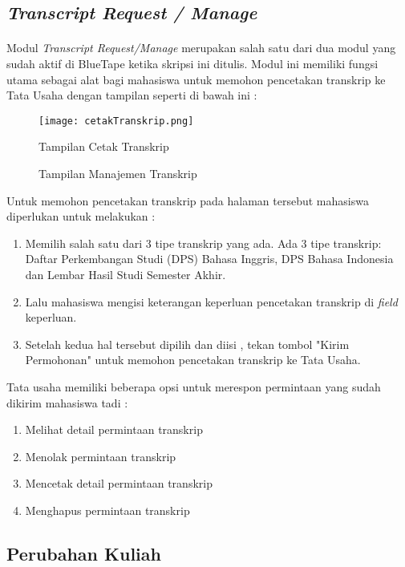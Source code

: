 \subsection{\textit{Transcript Request / Manage}}
\paragraph{} Modul \textit{Transcript Request/Manage} merupakan salah satu dari dua modul yang sudah aktif di BlueTape ketika skripsi ini ditulis. Modul ini memiliki fungsi utama sebagai alat bagi mahasiswa untuk memohon pencetakan transkrip ke Tata Usaha dengan tampilan seperti di bawah ini :
\begin{figure} [H]
	\centering  
	\texttt{[image: cetakTranskrip.png]}
	\caption[Tampilan Cetak Transkrip]{Tampilan Cetak Transkrip} 
	\label{fig:flow-chart-CodeIgniter} 
\end{figure}
\begin{figure} [H]
	\centering  
	\caption[Tampilan Manajemen Transkrip]{Tampilan Manajemen Transkrip} 
	\label{fig:flow-chart-CodeIgniter} 
\end{figure}
Untuk memohon pencetakan transkrip pada halaman tersebut mahasiswa diperlukan untuk melakukan :
\begin{enumerate}
  \item Memilih salah satu dari 3 tipe transkrip yang ada. Ada 3 tipe transkrip: Daftar Perkembangan Studi (DPS) Bahasa Inggris, DPS Bahasa Indonesia dan Lembar Hasil Studi Semester Akhir.
  \item Lalu mahasiswa mengisi keterangan keperluan pencetakan transkrip di \textit{field} keperluan.
  \item Setelah kedua hal tersebut dipilih dan diisi , tekan tombol "Kirim Permohonan" untuk memohon pencetakan transkrip ke Tata Usaha.
\end{enumerate}
Tata usaha memiliki beberapa opsi untuk merespon permintaan yang sudah dikirim mahasiswa tadi :
\begin{enumerate}
	\item Melihat detail permintaan transkrip
	\item Menolak permintaan transkrip
	\item Mencetak detail permintaan transkrip
	\item Menghapus permintaan transkrip
\end{enumerate}

\subsection{Perubahan Kuliah}
